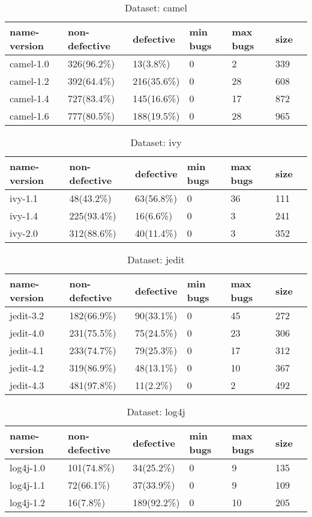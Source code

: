 \documentclass[]{article}
\begin{document}
	\begin{table}[h]
		\caption{Dataset: camel}\label{tab:camel}
		\begin{tabular}{lllllll}
			\hline
			name-version & non-defective & defective & min bugs & max bugs & size \\ \hline
			camel-1.0 & 326(96.2\%) & 13(3.8\%) & 0 & 2 & 339 \\ 
			camel-1.2 & 392(64.4\%) & 216(35.6\%) & 0 & 28 & 608 \\
			camel-1.4 & 727(83.4\%) & 145(16.6\%) & 0 & 17 & 872 \\ 
			camel-1.6 & 777(80.5\%) & 188(19.5\%) & 0 & 28 & 965 \\ \hline
		\end{tabular}
	\end{table}
	
	\begin{table}[h]
		\caption{Dataset: ivy}\label{tab:ivy}
		\begin{tabular}{lllllll}
			\hline
			name-version & non-defective & defective & min bugs & max bugs & size \\ \hline
			ivy-1.1 & 48(43.2\%) & 63(56.8\%) & 0 & 36 & 111 \\ 
			ivy-1.4 & 225(93.4\%) & 16(6.6\%) & 0 & 3 & 241 \\ 
			ivy-2.0 & 312(88.6\%) & 40(11.4\%) & 0 & 3 & 352 \\ \hline
		\end{tabular}
	\end{table}
	
	\begin{table}[h]
		\caption{Dataset: jedit}\label{tab:jedit}
		\begin{tabular}{lllllll}
			\hline
			name-version & non-defective & defective & min bugs & max bugs & size \\ \hline
			jedit-3.2 & 182(66.9\%) & 90(33.1\%) & 0 & 45 & 272 \\ 
			jedit-4.0 & 231(75.5\%) & 75(24.5\%) & 0 & 23 & 306 \\
			jedit-4.1 & 233(74.7\%) & 79(25.3\%) & 0 & 17 & 312 \\ 
			jedit-4.2 & 319(86.9\%) & 48(13.1\%) & 0 & 10 & 367 \\ 
			jedit-4.3 & 481(97.8\%) & 11(2.2\%) & 0 & 2 & 492 \\ \hline
		\end{tabular}
	\end{table}
	
	\begin{table}[h]
		\caption{Dataset: log4j}\label{tab:log4j}
		\begin{tabular}{lllllll}
			\hline
			name-version & non-defective & defective & min bugs & max bugs & size \\ \hline
			log4j-1.0 & 101(74.8\%) & 34(25.2\%) & 0 & 9 & 135 \\ 
			log4j-1.1 & 72(66.1\%) & 37(33.9\%) & 0 & 9 & 109 \\ 
			log4j-1.2 & 16(7.8\%) & 189(92.2\%) & 0 & 10 & 205 \\ \hline
		\end{tabular}
	\end{table}
	
\end{document}
